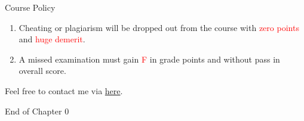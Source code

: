 \documentclass{beamer}
\begin{document}
\begin{frame}{Course Policy}
\begin{enumerate}
\item Cheating or plagiarism will be dropped out from the course with \textcolor{red}{zero points} and \textcolor{red}{huge demerit}. \\
\item A missed examination must gain \textcolor{red}{F} in grade points and without pass in overall score. 
\end{enumerate}
\end{frame}
\begin{frame}{}
\begin{center}
\Large{Feel free to contact me via \href{mailto:politics.tchsiao@gmail.com}{here}.}
\end{center}
\end{frame}
\begin{frame}{}
\begin{center}
\Large{End of Chapter 0}
\end{center}
\end{frame}
\end{document}
